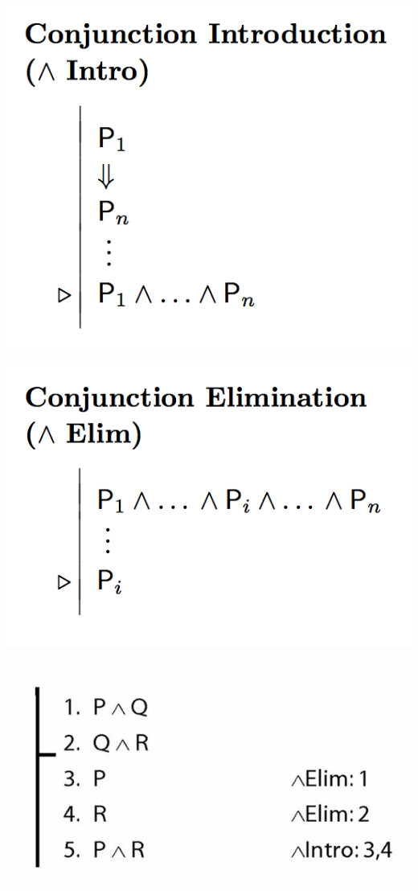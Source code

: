 \documentclass[12pt]{extarticle}
\begin{document}
\begin{multicols*}{3}
\begin{center}
\includegraphics[scale=0.3]{img/rule_conjunction_intro.png}
\end{center}
\begin{center}
\includegraphics[scale=0.3]{img/rule_conjunction_elim.png}
\end{center}
\begin{center}
\includegraphics[scale=0.3]{img/proof_unit_21.png}
\end{center}
\vfill

 


\end{multicols*}
\end{document}
